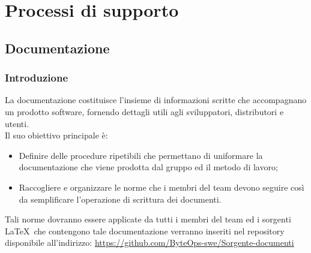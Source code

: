 \documentclass{article}
\begin{document}
\section{Processi di supporto}
\subsection{Documentazione}

\subsubsection{Introduzione}
La documentazione costituisce l'insieme di informazioni scritte che accompagnano un prodotto software, fornendo dettagli utili agli sviluppatori, distributori e utenti.\\
Il suo obiettivo principale è:
\begin{itemize}
    \item  Definire delle procedure ripetibili che permettano di uniformare la documentazione che viene prodotta dal gruppo ed il metodo di lavoro;
    \item  Raccogliere e organizzare le norme che i membri del team devono seguire così da semplificare l'operazione di scrittura dei documenti.
\end{itemize}
Tali norme dovranno essere applicate da tutti i membri del team ed i sorgenti \LaTeX\ che contengono tale documentazione verranno inseriti nel repository disponibile all'indirizzo:
\href{https://github.com/ByteOps-swe/Sorgente-documenti}{https://github.com/ByteOps-swe/Sorgente-documenti}

\end{document}
